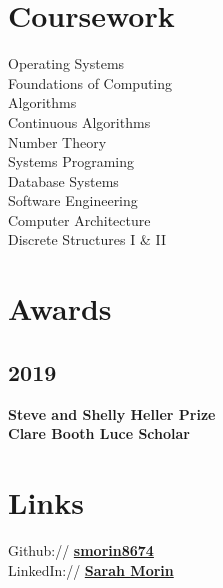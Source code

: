 \documentclass[]{deedy-resume-openfont}
\begin{document}
\begin{minipage}[t]{0.33\textwidth}
        \section{Coursework}
        Operating Systems\\
        Foundations of Computing\\
        Algorithms\\
        Continuous Algorithms\\
        Number Theory\\
        Systems Programing\\
        Database Systems\\
        Software Engineering\\
        Computer Architecture\\
        Discrete Structures I \& II \\


        \section{Awards}
        \subsection{2019}
        {\bf Steve and Shelly Heller Prize} \\
        {\bf Clare Booth Luce Scholar} \\


        \section{Links}
        Github:// \href{https://github.com/smorin8674}{\bf smorin8674}\\
        LinkedIn://  \href{https://www.linkedin.com/in/sarah-morin-500603165/}{\bf Sarah Morin} \\


\end{minipage}
\hfill
\end{document}
